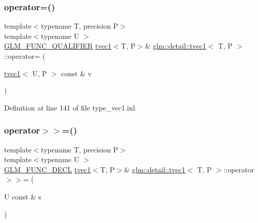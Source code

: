 \mbox{\label{structglm_1_1detail_1_1tvec1_afdd165d59a6a8369e37b85676929e05d}} 
\subsubsection{\texorpdfstring{operator=()}{operator=()}\hspace{0.1cm}{\footnotesize\ttfamily [3/3]}}
{\footnotesize\ttfamily template$<$typename T, precision P$>$ \\
template$<$typename U $>$ \\
\hyperlink{setup_8hpp_a33fdea6f91c5f834105f7415e2a64407}{G\+L\+M\+\_\+\+F\+U\+N\+C\+\_\+\+Q\+U\+A\+L\+I\+F\+I\+ER} \hyperlink{structglm_1_1detail_1_1tvec1}{tvec1}$<$T, P$>$\& \hyperlink{structglm_1_1detail_1_1tvec1}{glm\+::detail\+::tvec1}$<$ T, P $>$\+::operator= (\begin{DoxyParamCaption}\item[{\hyperlink{structglm_1_1detail_1_1tvec1}{tvec1}$<$ U, P $>$ const \&}]{v }\end{DoxyParamCaption})}



Definition at line 141 of file type\+\_\+vec1.\+inl.

\mbox{\label{structglm_1_1detail_1_1tvec1_a19aaf3b4350fe2a5c245775e4fa4d80c}} 
\subsubsection{\texorpdfstring{operator$>$$>$=()}{operator>>=()}\hspace{0.1cm}{\footnotesize\ttfamily [1/4]}}
{\footnotesize\ttfamily template$<$typename T, precision P$>$ \\
template$<$typename U $>$ \\
\hyperlink{setup_8hpp_ab2d052de21a70539923e9bcbf6e83a51}{G\+L\+M\+\_\+\+F\+U\+N\+C\+\_\+\+D\+E\+CL} \hyperlink{structglm_1_1detail_1_1tvec1}{tvec1}$<$T, P$>$\& \hyperlink{structglm_1_1detail_1_1tvec1}{glm\+::detail\+::tvec1}$<$ T, P $>$\+::operator$>$$>$= (\begin{DoxyParamCaption}\item[{U const \&}]{s }\end{DoxyParamCaption})}

